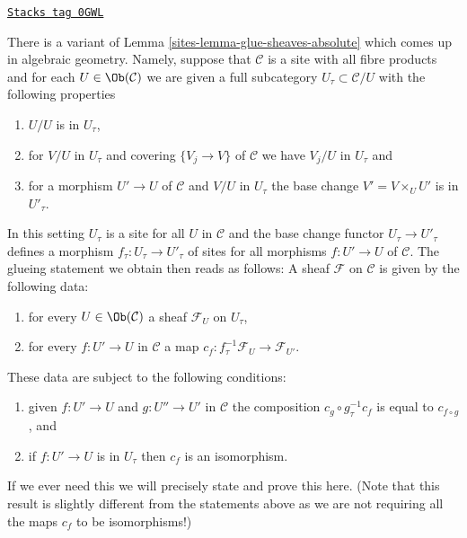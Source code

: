 \begin{remark}
\label{sites-remark-variant-glue-sheaves-absolute}
\href{https://stacks.math.columbia.edu/tag/0GWL}{\texttt{Stacks tag 0GWL}}

There is a variant of Lemma \ref{sites-lemma-glue-sheaves-absolute}
which comes up in algebraic geometry. Namely, suppose that $\mathcal{C}$
is a site with all fibre products and for each $U \in \Ob(\mathcal{C})$
we are given a full subcategory $U_\tau \subset \mathcal{C}/U$ with
the following properties
\begin{enumerate}
\item $U/U$ is in $U_\tau$,
\item for $V/U$ in $U_\tau$ and covering $\{V_j \to V\}$
of $\mathcal{C}$ we have $V_j/U$ in $U_\tau$ and
\item for a morphism $U' \to U$ of $\mathcal{C}$ and $V/U$ in $U_\tau$
the base change $V' = V \times_U U'$ is in $U'_\tau$.
\end{enumerate}
In this setting $U_\tau$ is a site for all $U$ in $\mathcal{C}$
and the base change functor $U_\tau \to U'_\tau$ defines a morphism
$f_\tau : U_\tau \to U'_\tau$ of sites for all morphisms $f : U' \to U$
of $\mathcal{C}$. The glueing statement we obtain then reads as follows:
A sheaf $\mathcal{F}$ on $\mathcal{C}$ is given by the following data:
\begin{enumerate}
\item for every $U \in \Ob(\mathcal{C})$ a sheaf
$\mathcal{F}_U$ on $U_\tau$,
\item for every $f : U' \to U$ in $\mathcal{C}$ a map
$c_f : f_\tau^{-1}\mathcal{F}_U \to \mathcal{F}_{U'}$.
\end{enumerate}
These data are subject to the following conditions:
\begin{enumerate}
\item[(a)] given $f : U' \to U$ and $g : U'' \to U'$ in
$\mathcal{C}$ the composition
$c_g \circ g_\tau^{-1}c_f$ is equal to $c_{f \circ g}$, and
\item[(b)] if $f : U' \to U$ is in $U_\tau$ then $c_f$ is an isomorphism.
\end{enumerate}
If we ever need this we will precisely state and prove this here.
(Note that this result is slightly different from the statements
above as we are not requiring all the maps $c_f$ to be isomorphisms!)
\end{remark}

